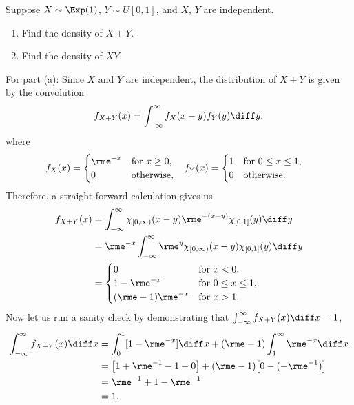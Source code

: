 \begin{problem}[Handout 17, \# 16]
  Suppose \(X\sim\Exp(1)\), \(Y\sim U[0,1]\), and \(X\), \(Y\) are
  independent.
  \begin{enumerate}[label=(\alph*),noitemsep]
  \item Find the density of \(X+Y\).
  \item Find the density of \(XY\).
  \end{enumerate}
\end{problem}
\begin{solution}
  For part (a): Since \(X\) and \(Y\) are independent, the distribution of
  \(X+Y\) is given by the convolution
  \[
    f_{X+Y}(x)=\int_{-\infty}^\infty f_X(x-y)f_Y(y)\diff y,
  \]
  where
  \begin{align*}
    f_X(x)
      &=\begin{cases}
        \rme^{-x}&\text{for \(x\geq 0\),}\\
        0&\text{otherwise,}
      \end{cases}
    &f_Y(x)
       &=\begin{cases}
         1&\text{for \(0\leq x\leq 1\),}\\
         0&\text{otherwise.}
       \end{cases}
  \end{align*}
  Therefore, a straight forward calculation gives us
  \begin{align*}
    f_{X+Y}(x)
    &=\int_{-\infty}^\infty
      \chi_{[0,\infty)}(x-y)\rme^{-(x-y)}\chi_{[0,1]}(y)\diff y\\
    &=\rme^{-x}\int_{-\infty}^{\infty}\rme^y\chi_{[0,\infty)}(x-y)\chi_{[0,1]}(y)\diff
      y\\
    &=\begin{cases}
        0&\text{for \(x<0\),}\\
        1-\rme^{-x}&\text{for \(0\leq x\leq 1\),}\\
        (\rme-1)\rme^{-x}&\text{for \(x>1\).}
      \end{cases}
  \end{align*}
  Now let us run a sanity check by demonstrating that
  \(\int_{-\infty}^\infty f_{X+Y}(x)\diff x=1\),
  \begin{align*}
    \int_{-\infty}^\infty f_{X+Y}(x)\diff x
    &=\int_0^1 [1-\rme^{-x}]\diff x+(\rme-1)\int_1^\infty\rme^{-x}\diff x\\
    &=\bigl[1+\rme^{-1}-1-0\bigr]+(\rme-1)\bigl[0-(-\rme^{-1})\bigr]\\
    &=\rme^{-1}+1-\rme^{-1}\\
    &=1.
  \end{align*}


\end{solution}
